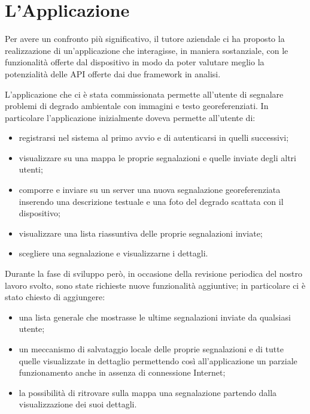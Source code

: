 \chapter{L'Applicazione}
	Per avere un confronto più significativo, il tutore aziendale ci ha proposto
	la realizzazione di un'applicazione che interagisse, in maniera sostanziale,
	con le funzionalità offerte dal dispositivo in modo da poter valutare meglio
	la potenzialità delle API offerte dai due frame\-work in analisi.
	
	L'applicazione che ci è stata commissionata permette all'utente di segnalare 
	problemi di degrado ambientale con immagini e testo georeferenziati.
	In particolare l'applicazione inizialmente doveva permette all'utente di:
	\begin{itemize}
		\item registrarsi nel sistema al primo avvio e di autenticarsi in quelli
		      successivi;
		\item visualizzare su una mappa le proprie segnalazioni e quelle inviate
		      degli altri utenti;
		\item comporre e inviare su un server una nuova segnalazione
		      georeferenziata inserendo una descrizione testuale e una foto del
		      degrado scattata con il dispositivo;
		\item visualizzare una lista riassuntiva delle proprie segnalazioni
		      inviate;
		\item scegliere una segnalazione e visualizzarne i dettagli.
	\end{itemize}
	Durante la fase di sviluppo però, in occasione della revisione periodica del
	nostro lavoro svolto, sono state richieste nuove funzionalità aggiuntive; in
	particolare ci è stato chiesto di aggiungere:
	\begin{itemize}
		\item una lista generale che mostrasse le ultime segnalazioni inviate da
		      qualsiasi utente;
		\item un meccanismo di salvataggio locale delle proprie segnalazioni e
		      di tutte quelle visualizzate in dettaglio permettendo così
		      all'applicazione un parziale funzionamento anche in assenza di
		      connessione Internet;
		\item la possibilità di ritrovare sulla mappa una segnalazione partendo
		      dalla visualizzazione dei suoi dettagli.
	\end{itemize}
	
